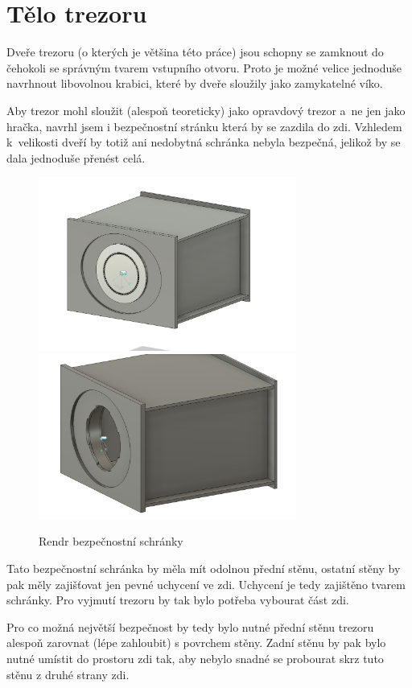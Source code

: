 \section{Tělo trezoru}
Dveře trezoru (o kterých je většina této práce) jsou schopny se zamknout do čehokoli se správným tvarem vstupního otvoru. 
Proto je možné velice jednoduše navrhnout libovolnou krabici, které by dveře sloužily jako zamykatelné víko. 

Aby trezor mohl sloužit (alespoň teoreticky) jako opravdový trezor a~ne jen jako hračka, navrhl jsem i bezpečnostní stránku která by se zazdila do zdi. 
Vzhledem k~velikosti dveří by totiž ani nedobytná schránka nebyla bezpečná, jelikož by se dala jednoduše přenést celá.

\begin{figure}[h]
    \centering
    \includegraphics[width=240pt]{kapitoly/obrazky/E4/bedna/bedna.png}
    \includegraphics[width=240pt]{kapitoly/obrazky/E4/bedna/jen-bedna.png}
    \caption{Rendr bezpečnostní schránky}
    \label{fig:E4-bedna}
\end{figure}

Tato bezpečnostní schránka by měla mít odolnou přední stěnu, ostatní stěny by pak měly zajišťovat jen pevné uchycení ve zdi.
Uchycení je tedy zajištěno tvarem schránky. Pro vyjmutí trezoru by tak bylo potřeba vybourat část zdi.
\enlargethispage{5mm}

Pro co možná největší bezpečnost by tedy bylo nutné přední stěnu trezoru alespoň zarovnat (lépe zahloubit) s povrchem stěny.
Zadní stěnu by pak bylo nutné umístit do prostoru zdi tak, aby nebylo snadné se probourat skrz tuto stěnu z druhé strany zdi.  %